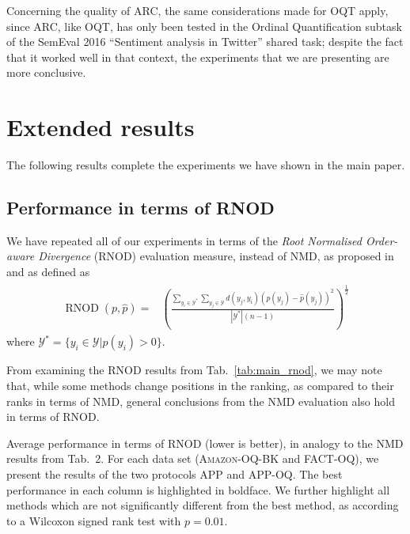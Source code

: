 \documentclass[10pt,a4paper]{article}
\DeclareMathOperator{\rnod}{RNOD}
\begin{document}
Concerning the quality of
ARC, the same considerations made for OQT apply, since ARC, like OQT,
has only been tested in the Ordinal Quantification subtask of the
SemEval 2016 ``Sentiment analysis in Twitter'' shared task; despite
the fact that it worked well in that context, the experiments that we
are presenting are more conclusive.

\section{Extended results}

\noindent The following results complete the experiments we have shown
in the main paper.

\subsection{Performance in terms of RNOD}

\noindent We have repeated all of our experiments in terms of the \emph{Root Normalised
Order-aware Divergence} (RNOD) evaluation measure, instead of NMD, as proposed
in~\cite{Sakai:2018cf} and as defined as
%
\begin{align}
  \begin{split}
    \label{eq:RNOD}
    \rnod(p,\hat{p}) = & \left(\frac{\sum_{y_{i}\in\mathcal{Y}^{*}}
      \sum_{y_{j}\in\mathcal{Y}}d(y_{j},y_{i})(p(y_{j})-\hat{p}(y_{j}))^{2}}{|\mathcal{Y}^{*}|(n-1)}\right)^{\frac{1}{2}}
  \end{split}
\end{align}
% 
\noindent where
$\mathcal{Y}^{*}=\{y_{i}\in\mathcal{Y}|p(y_{i})>0\}$.

From examining the RNOD results from Tab.~\ref{tab:main_rnod}, we may note that, while some methods change
positions in the ranking, as compared to their ranks in terms of NMD,
general conclusions from the NMD evaluation also hold in terms of
RNOD.

\begin{table}
  \centering
  \caption{Average performance in terms of RNOD (lower is better), in analogy to the NMD results from Tab.~2. For each data set (\textsc{Amazon-OQ-BK} and \textsc{FACT-OQ}), we present the results of the two protocols APP and \mbox{APP-OQ}. The best performance in each column is highlighted in boldface. We further highlight all methods which are not significantly different from the best method, as according to a Wilcoxon signed rank test with $p=0.01$.}
  \label{tab:main_rnod}
  \scriptsize
  
\end{table}
\end{document}
